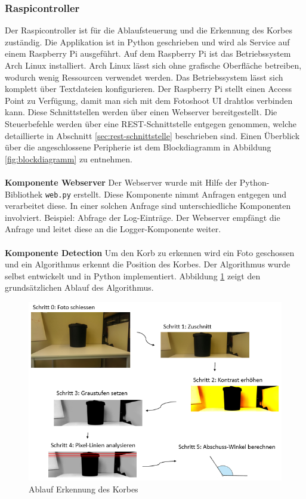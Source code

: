 \subsubsection{Raspicontroller}
Der Raspicontroller ist für die Ablaufsteuerung und die Erkennung des Korbes zuständig. Die Applikation ist in Python geschrieben und wird als Service auf einem Raspberry Pi ausgeführt. Auf dem Raspberry Pi ist das Betriebssystem Arch Linux installiert. Arch Linux lässt sich ohne grafische Oberfläche betreiben, wodurch wenig Ressourcen verwendet werden. Das Betriebssystem lässt sich komplett über Textdateien konfigurieren. Der Raspberry Pi stellt einen Access Point zu Verfügung, damit man sich mit dem Fotoshoot UI drahtlos verbinden kann. Diese Schnittstellen werden über einen Webserver bereitgestellt. Die Steuerbefehle werden über eine REST-Schnittstelle entgegen genommen, welche detaillierte in Abschnitt \ref{sec:rest-schnittstelle} beschrieben sind. Einen Überblick über die angeschlossene Peripherie ist dem Blockdiagramm in Abbildung \ref{fig:blockdiagramm} zu entnehmen.
\\
\\
\textbf{Komponente Webserver}
Der Webserver wurde mit Hilfe der Python-Bibliothek \texttt{web.py} erstellt. Diese Komponente nimmt Anfragen entgegen und verarbeitet diese. In einer solchen Anfrage sind unterschiedliche Komponenten involviert. Beispiel: Abfrage der Log-Einträge. Der Webserver empfängt die Anfrage und leitet diese an die Logger-Komponente weiter.
\\
\\
\textbf{Komponente Detection}
Um den Korb zu erkennen wird ein Foto geschossen und ein Algorithmus erkennt die Position des Korbes. Der Algorithmus wurde selbst entwickelt und in Python implementiert. Abbildung \ref{fig:ablauf-ortung-des-korbes-algorithmus} zeigt den grundsätzlichen Ablauf des Algorithmus.

\begin{figure}[h!]
	\centering
	\includegraphics[width=0.7\linewidth]{../../fig/ablauf-ortung-des-korbes-algorithmus}
	\caption{Ablauf Erkennung des Korbes}
	\label{fig:ablauf-ortung-des-korbes-algorithmus}
\end{figure}


